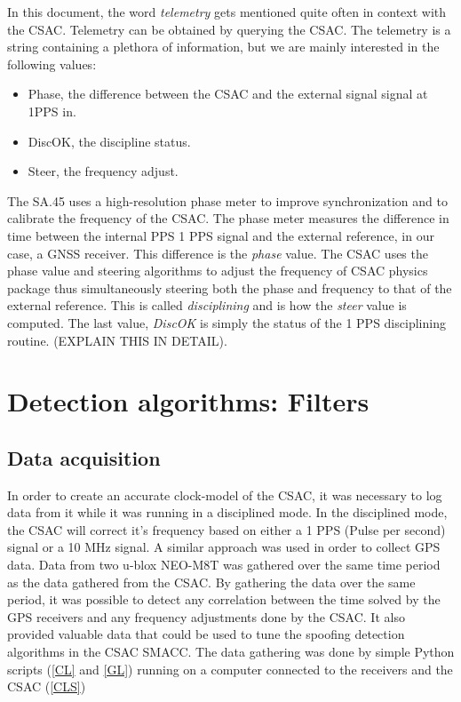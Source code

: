 \documentclass[12pt,english,a4paper]{report}
\begin{document}
In this document, the word \textit{telemetry} gets mentioned quite often in context with the CSAC. Telemetry can be obtained by querying the CSAC. The telemetry is a string containing a plethora of information, but we are mainly interested in the following values:
\begin{itemize}
  \item{Phase, the difference between the CSAC and the external signal signal at 1PPS in.}
  \item{DiscOK, the discipline status.}
  \item{Steer, the frequency adjust.}
\end{itemize}
The SA.45 uses a high-resolution phase meter to improve synchronization and to calibrate the frequency of the CSAC. The phase meter measures the difference in time between the internal PPS 1 PPS signal and the external reference, in our case, a GNSS receiver. This difference is the \textit{phase} value. The CSAC uses the phase value and steering algorithms to adjust the frequency of CSAC physics package thus simultaneously steering both the phase and frequency to that of the external reference. This is called \textit{disciplining} and is how the \textit{steer} value is computed. The last value, \textit{DiscOK} is simply the status of the 1 PPS disciplining routine. \cite{CSAC_USERGUIDE} (EXPLAIN THIS IN DETAIL). 

\section{Detection algorithms: Filters}
\subsection{Data acquisition}\label{data_aquisition}
In order to create an accurate clock-model of the CSAC, it was necessary to log data from it while it was running in a disciplined mode. In the disciplined mode, the CSAC will correct it's frequency based on either a 1 PPS (Pulse per second) signal or a 10 MHz signal. A similar approach was used in order to collect GPS data. Data from two u-blox NEO-M8T was gathered over the same time period as the data gathered from the CSAC. By gathering the data over the same period, it was possible to detect any correlation between the time solved by the GPS receivers and any frequency adjustments done by the CSAC. It also provided valuable data that could be used to tune the spoofing detection algorithms in the CSAC SMACC. The data gathering was done by simple Python scripts (\ref{CL} and \ref{GL}) running on a computer connected to the receivers and the CSAC (\ref{CLS})
\end{document}
